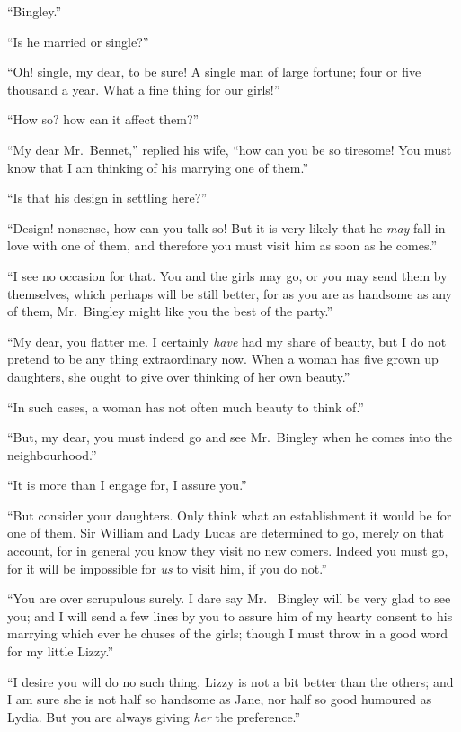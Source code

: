“Bingley.”

“Is he married or single?”

“Oh! single, my dear, to be sure! A single man of
large fortune; four or five thousand a year. What a fine
thing for our girls!”

“How so? how can it affect them?”

“My dear Mr.\ Bennet,” replied his wife, “how can you
be so tiresome! You must know that I am thinking of his
marrying one of them.”

“Is that his design in settling here?”

“Design! nonsense, how can you talk so! But it is
very likely that he \textit{may} fall in love with one of them, and
therefore you must visit him as soon as he comes.”

“I see no occasion for that. You and the girls may go,
or you may send them by themselves, which perhaps will
be still better, for as you are as handsome as any of them,
Mr.\ Bingley might like you the best of the party.”

“My dear, you flatter me. I certainly \textit{have} had my
share of beauty, but I do not pretend to be any thing
extraordinary now. When a woman has five grown up daughters,
she ought to give over thinking of her own beauty.”

“In such cases, a woman has not often much beauty
to think of.”

“But, my dear, you must indeed go and see Mr.\ Bingley
when he comes into the neighbourhood.”

“It is more than I engage for, I assure you.”

“But consider your daughters. Only think what an
establishment it would be for one of them. Sir William
and Lady Lucas are determined to go, merely on that
account, for in general you know they visit no new comers.
Indeed you must go, for it will be impossible for \textit{us} to
visit him, if you do not.”

“You are over scrupulous surely. I dare say Mr.\ %
Bingley will be very glad to see you; and I will send
a few lines by you to assure him of my hearty consent
to his marrying which ever he chuses of the girls; though
I must throw in a good word for my little Lizzy.”

“I desire you will do no such thing. Lizzy is not
a bit better than the others; and I am sure she is not half
so handsome as Jane, nor half so good humoured as Lydia.
But you are always giving \textit{her} the preference.”

